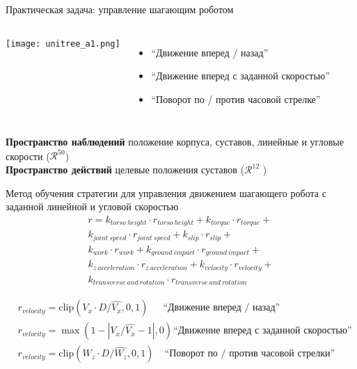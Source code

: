 \begin{frame}{Практическая задача: управление шагающим роботом}
\begin{columns}
\centering
\texttt{[image: unitree\_a1.png]}
\begin{itemize}
    \item ``Движение вперед / назад''
	\item ``Движение вперед с заданной скоростью''
    \item ``Поворот по / против часовой стрелке''
\end{itemize}
\end{columns}
\textbf{Пространство наблюдений} положение корпуса, суставов, линейные и угловые скорости ($\mathcal{R}^{50}$) 
\\
\textbf{Пространство действий} целевые положения суставов ($\mathcal{R}^{12}$ )

\end{frame}

\begin{frame}{Метод обучения стратегии для управления движением
шагающего робота с заданной линейной и угловой скоростью}
\begin{multline*}
    r = k_{torso\ height} \cdot r_{torso\ height} +
    k_{torque} \cdot r_{torque} +\\
    k_{joint\ speed} \cdot r_{joint\ speed} +
    k_{slip} \cdot r_{slip} +\\
    k_{work} \cdot r_{work} + 
    k_{ground\ impact} \cdot r_{ground\ impact} +\\
    k_{z\ acceleration} \cdot r_{z\ acceleration} +  k_{velocity} \cdot r_{velocity} +\\
    k_{transverse\ and\ rotation} \cdot r_{transverse\ and\ rotation}
\label{eq:unitree_reward}
\end{multline*}

\begin{align*}
& r_{velocity} = \mathrm{clip}(V_x \cdot D / \hat{V_x}, 0, 1) \hspace{18pt}\text{``Движение вперед / назад''}\\
& r_{velocity} = \max(1 - |V_x / \hat{V_x} - 1|, 0) \hspace{1pt}\text{``Движение вперед с заданной скоростью''}\\
& r_{velocity} = \mathrm{clip}(W_z \cdot D / \hat{W_z}, 0, 1) \hspace{13pt}\text{``Поворот по / против часовой стрелки''}
\end{align*}
\end{frame}

